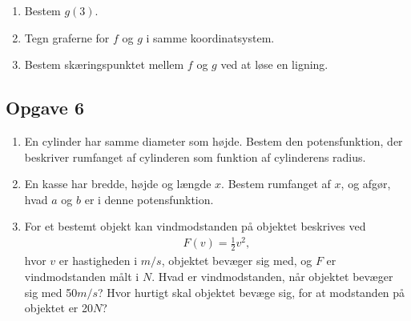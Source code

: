 \begin{enumerate}[label=\roman*)]
	\item Bestem $g(3)$.
	\item Tegn graferne for $f$ og $g$ i samme koordinatsystem.
	\item Bestem skæringspunktet mellem $f$ og $g$ ved at løse en ligning. 
\end{enumerate}

\subsection*{Opgave 6}
\begin{enumerate}[label=\roman*)]
\item En cylinder har samme diameter som højde. Bestem den potensfunktion, der beskriver rumfanget af cylinderen som funktion af cylinderens radius. 
\item En kasse har bredde, højde og længde $x$. Bestem rumfanget af $x$, og afgør, hvad $a$ og $b$ er i denne potensfunktion.
\item For et bestemt objekt kan vindmodstanden på objektet beskrives ved 
\begin{align*}
F(v)= \frac{1}{2}v^2,
\end{align*}
hvor $v$ er hastigheden i $m/s$, objektet bevæger sig med, og $F$ er vindmodstanden målt i $N$. Hvad er vindmodstanden, når objektet bevæger sig med 50$m/s$? Hvor hurtigt skal objektet bevæge sig, for at modstanden på objektet er 20$N$?

\end{enumerate}